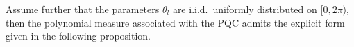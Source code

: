 \documentclass[%
 superscriptaddress,
 aps,prl,
 reprint,
 twocolumn,
 amsmath,amssymb,showpacs,
 bibnotes,
]{revtex4-2}
\newtheorem{theorem}{Theorem}
\newcommand*{\dif}{\mathop{}\!\mathrm{d}}
\begin{document}
Assume further that the parameters $\theta_l$ are i.i.d.\ uniformly distributed on $[0,2\pi)$, then the polynomial measure associated with the PQC admits the explicit form given in the following proposition.
    
\end{document}
